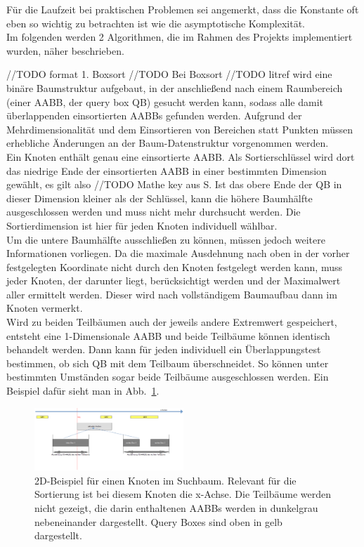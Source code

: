 Für die Laufzeit bei praktischen Problemen sei angemerkt, dass die Konstante oft eben so wichtig zu betrachten ist wie die asymptotische Komplexität. \\

Im folgenden werden 2 Algorithmen, die im Rahmen des Projekts implementiert wurden, näher beschrieben.

//TODO format
1. Boxsort
//TODO
Bei Boxsort //TODO litref wird eine binäre Baumstruktur aufgebaut, in der anschließend nach einem Raumbereich (einer AABB, der query box QB) gesucht werden kann, sodass alle damit überlappenden einsortierten AABBs gefunden werden. Aufgrund der Mehrdimensionalität und dem Einsortieren von Bereichen statt Punkten müssen erhebliche Änderungen an der Baum-Datenstruktur vorgenommen werden.\\
Ein Knoten enthält genau eine einsortierte AABB. Als Sortierschlüssel wird dort das niedrige Ende der einsortierten AABB in einer bestimmten Dimension gewählt, es gilt also //TODO Mathe key aus S. Ist das obere Ende der QB in dieser Dimension kleiner als der Schlüssel, kann die höhere Baumhälfte ausgeschlossen werden und muss nicht mehr durchsucht werden. Die Sortierdimension ist hier für jeden Knoten individuell wählbar.\\
Um die untere Baumhälfte ausschließen zu können, müssen jedoch weitere Informationen vorliegen. Da die maximale Ausdehnung nach oben in der vorher festgelegten Koordinate nicht durch den Knoten festgelegt werden kann, muss jeder Knoten, der darunter liegt, berücksichtigt werden und der Maximalwert aller ermittelt werden. Dieser wird nach vollständigem Baumaufbau dann im Knoten vermerkt.\\
Wird zu beiden Teilbäumen auch der jeweils andere Extremwert gespeichert, entsteht eine 1-Dimensionale AABB und beide Teilbäume können identisch behandelt werden. Dann kann für jeden individuell ein Überlappungstest bestimmen, ob sich QB mit dem Teilbaum überschneidet. So können unter bestimmten Umständen sogar beide Teilbäume ausgeschlossen werden. Ein Beispiel dafür sieht man in Abb.~\ref{fig:boxsortNode}.\\

\begin{figure}
    \centering
    \includegraphics[width=0.5\textwidth]{./res/BoxsortNode.png}
    \caption{2D-Beispiel für einen Knoten im Suchbaum. Relevant für die Sortierung ist bei diesem Knoten die x-Achse. Die Teilbäume werden nicht gezeigt, die darin enthaltenen AABBs werden in dunkelgrau nebeneinander dargestellt. Query Boxes sind oben in gelb dargestellt.}
    \label{fig:boxsortNode}
\end{figure}

